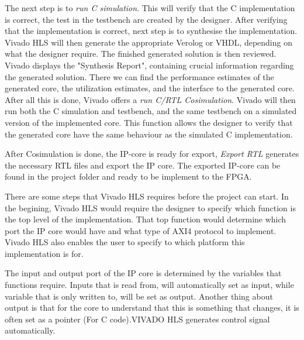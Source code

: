 The next step is to \textit{run C simulation}. This will verify that the C implementation is correct, the test in the testbench are created by the designer. After verifying that the implementation is correct, next step is to synthesise the implementation. Vivado HLS will then generate the appropriate Verolog or VHDL, depending on what the designer require. The finished generated solution is then reviewed. Vivado displays the "Synthesis Report", containing crucial information regarding the generated solution. There we can find the performance estimates of the generated core, the utilization estimates, and the interface to the generated core. After all this is done, Vivado offers a \textit{run C/RTL Cosimulation}. Vivado will then run both the C simulation and testbench, and the same testbench on a simulated version of the implemented core. This function allows the designer to verify that the generated core have the same behaviour as the simulated C implementation.

After Cosimulation is done, the IP-core is ready for export, \textit{Export RTL} generates the necessary RTL files and export the IP core. The exported IP-core can be found in the project folder and ready to be implement to the FPGA. 

There are some steps that Vivado HLS requires before the project can start. In the begining, Vivado HLS would require the designer to specify which function is the top level of the implementation. That top function would determine which port the IP core would have and what type of AXI4 protocol to implement. Vivado HLS also enables the user to specify to which platform this implementation is for.

The input and output port of the IP core is determined by the variables that functions require. Inputs that is read from, will automatically set as input, while variable that is only written to, will be set as output. Another thing about output is that for the core to understand that this is something that changes, it is often set as a pointer (For C code).VIVADO HLS generates control signal automatically. 

